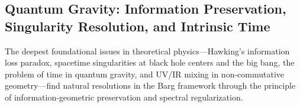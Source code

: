
\subsection{Quantum Gravity: Information Preservation, Singularity Resolution, and Intrinsic Time}
\label{subsec:quantumGravityResolutions}

\begin{overview}
The deepest foundational issues in theoretical physics---Hawking's information loss paradox, spacetime singularities at black hole centers and the big bang, the problem of time in quantum gravity, and UV/IR mixing in non-commutative geometry---find natural resolutions in the Barg framework through the principle of information-geometric preservation and spectral regularization.
\end{overview}

